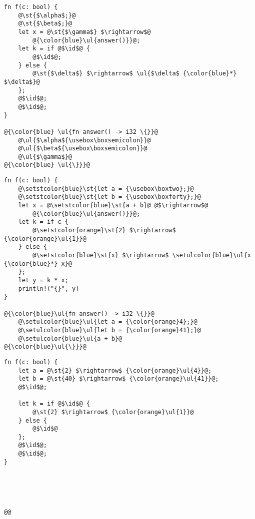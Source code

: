 \documentclass[a4paper,11pt]{article}
\newcommand\id{\square}
\begin{document}
\noindent
\begin{minipage}{.32\textwidth}
\newbox\boxsemicolon
\sbox\boxsemicolon{\color{blue}\texttt{;}}
\begin{lstlisting}[rulecolor=\color{blue!20}]
fn f(c: bool) {
    @\st{$\alpha$;}@
    @\st{$\beta$;}@
    let x = @\st{$\gamma$} $\rightarrow$@
        @{\color{blue}\ul{answer()}}@;
    let k = if @$\id$@ {
        @$\id$@;
    } else {
        @\st{$\delta$} $\rightarrow$ \ul{$\delta$ {\color{blue}*} $\delta$}@
    };
    @$\id$@;
    @$\id$@;
}

@{\color{blue} \ul{fn answer() -> i32 \{}}@
    @\ul{$\alpha${\usebox\boxsemicolon}}@
    @\ul{$\beta${\usebox\boxsemicolon}}@
    @\ul{$\gamma$}@
@{\color{blue} \ul{\}}}@
\end{lstlisting}
\end{minipage}\hfill
\begin{minipage}{.32\textwidth}
\newbox\boxtwo
\sbox{}
\newbox\boxforty
\sbox{}
\begin{lstlisting}
fn f(c: bool) {
    @\setstcolor{blue}\st{let a = {\usebox\boxtwo};}@
    @\setstcolor{blue}\st{let b = {\usebox\boxforty};}@
    let x = @\setstcolor{blue}\st{a + b}@ @$\rightarrow$@
        @{\color{blue}\ul{answer()}}@;
    let k = if c {
        @\setstcolor{orange}\st{2} $\rightarrow$ {\color{orange}\ul{1}}@
    } else {
        @\setstcolor{blue}\st{x} $\rightarrow$ \setulcolor{blue}\ul{x {\color{blue}*} x}@
    };
    let y = k * x;
    println!("{}", y)
}

@{\color{blue}\ul{fn answer() -> i32 \{}}@
    @\setulcolor{blue}\ul{let a = {\color{orange}4};}@
    @\setulcolor{blue}\ul{let b = {\color{orange}41};}@
    @\setulcolor{blue}\ul{a + b}@
@{\color{blue}\ul{\}}}@
\end{lstlisting}
\end{minipage}\hfill
\begin{minipage}{.32\textwidth}
\begin{lstlisting}[rulecolor=\color{orange!30}]
fn f(c: bool) {
    let a = @\st{2} $\rightarrow$ {\color{orange}\ul{4}}@;
    let b = @\st{40} $\rightarrow$ {\color{orange}\ul{41}}@;
    @$\id$@;

    let k = if @$\id$@ {
        @\st{2} $\rightarrow$ {\color{orange}\ul{1}}@
    } else {
        @$\id$@
    };
    @$\id$@;
    @$\id$@;
}





@@
\end{lstlisting}
\end{minipage}\hfill
\vspace{-.4cm}
\begin{lstlisting}[label=lst:overview_diffs, caption={Left (resp. right) represent the difference between original source code and blue commit (resp. orange commit). Center is the syntactic fusion of these two differences.}]
\end{lstlisting}
\end{document}
